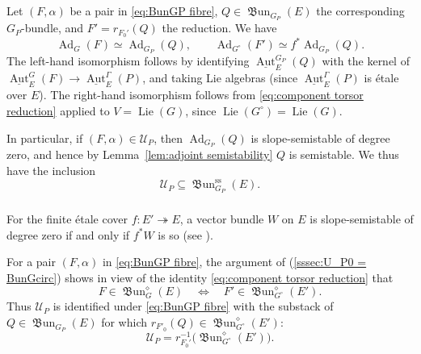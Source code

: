 \documentclass[12pt, oneside]{amsart}
\numberwithin{equation}{section}
\theoremstyle{remark}
\theoremstyle{plain}
\newcommand{\UU}{\mathcal{U}}
\renewcommand{\ss}{\mathrm{ss}}
\newcommand{\frBun}{\operatorname{\mathfrak{B}un}}
\newcommand{\uAut}{\underline{\operatorname{Aut}}}
\begin{document}
\subsubsection{}

Let $(F,\alpha)$ be a pair in \eqref{eq:BunGP fibre}, $Q \in \frBun_{G_P}(E)$ the corresponding $G_P$-bundle, and $F'=r_{F_0'}(Q)$ the reduction.
We have
\begin{equation}\label{eq:component torsor adjoint}
  \operatorname{Ad}_G(F) \simeq \operatorname{Ad}_{G_P}(Q),
  \qquad
  \operatorname{Ad}_{G^\circ}(F')\simeq f^*\operatorname{Ad}_{G_P}(Q).
\end{equation}
The left-hand isomorphism follows by identifying $\uAut_E^{G_P}(Q)$ with the kernel of $\uAut_E^G(F)\to\uAut_E^\Gamma(P)$, and taking Lie algebras (since $\uAut_E^\Gamma(P)$ is \'etale over $E$).
The right-hand isomorphism follows from \eqref{eq:component torsor reduction} applied to $V=\operatorname{Lie}(G)$, since $\operatorname{Lie}(G^\circ)=\operatorname{Lie}(G)$.

In particular, if $(F,\alpha)\in\UU_P$, then $\operatorname{Ad}_{G_P}(Q)$ is slope-semistable of degree zero, and hence by Lemma~\ref{lem:adjoint semistability} $Q$ is semistable.
We thus have the inclusion
\[
  \UU_P\subseteq\frBun_{G_P}^{\ss}(E).
\]

\subsubsection{}\label{sssec:U_P = r inv diamond}

For the finite \'etale cover $f:E'\twoheadrightarrow E$, a vector bundle $W$ on $E$ is slope-semistable of degree zero if and only if $f^*W$ is so (see \cite[Lem.~2.1(ii--iii)]{Weissmann}).

For a pair $(F,\alpha)$ in \eqref{eq:BunGP fibre}, the argument of (\ref{sssec:U_P0 = BunGcirc}) shows in view of the identity \eqref{eq:component torsor reduction} that
\[
  F\in\frBun_G^\diamond(E)
  \quad\Longleftrightarrow\quad
  F'\in\frBun_{G^\circ}^\diamond(E').
\]
Thus $\UU_P$ is identified under \eqref{eq:BunGP fibre} with the substack of $Q \in \frBun_{G_P}(E)$ for which $r_{F'_0}(Q) \in \frBun_{G^\circ}^\diamond(E')$:
\begin{equation}\label{eq:BunGP diamond inverse image}
  \UU_P = r_{F_0'}^{-1}\bigl(\frBun_{G^\circ}^\diamond(E')\bigr).
\end{equation}

\subsubsection{}
\end{document}

